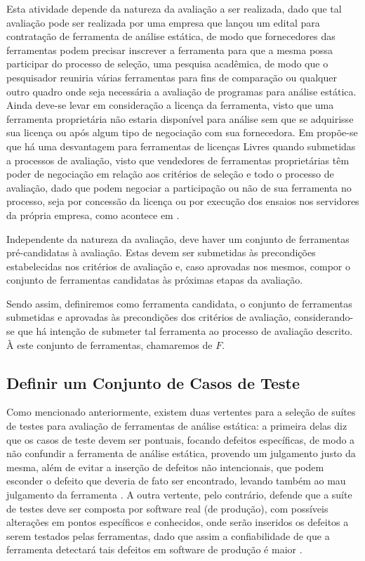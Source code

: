 Esta atividade depende da natureza da avaliação a ser realizada, dado que tal avaliação pode ser realizada por uma empresa que lançou um edital para contratação de ferramenta de análise estática, de modo que fornecedores das ferramentas podem precisar inscrever a ferramenta para que a mesma possa participar do processo de seleção, uma pesquisa acadêmica, de modo que o pesquisador reuniria várias ferramentas para fins de comparação ou qualquer outro quadro onde seja necessária a avaliação de programas para análise estática. Ainda deve-se levar em consideração a licença da ferramenta, visto que uma ferramenta proprietária não estaria disponível para análise sem que se adquirisse sua licença ou após algum tipo de negociação com sua fornecedora. Em \cite{pascal} propõe-se que há uma desvantagem para ferramentas de licenças Livres quando submetidas a processos de avaliação, visto que vendedores de ferramentas proprietárias têm poder de negociação em relação aos critérios de seleção e todo o processo de avaliação, dado que podem negociar a participação ou não de sua ferramenta no processo, seja por concessão da licença ou por execução dos ensaios nos servidores da própria empresa, como acontece em \cite{sate_iv}.

Independente da natureza da avaliação, deve haver um conjunto de ferramentas pré-candidatas à avaliação. Estas devem ser submetidas às precondições estabelecidas nos critérios de avaliação e, caso aprovadas nos mesmos, compor o conjunto de ferramentas candidatas às próximas etapas da avaliação.

Sendo assim, definiremos como ferramenta candidata, o conjunto de ferramentas submetidas e aprovadas às precondições dos critérios de avaliação, considerando-se que há intenção de submeter tal ferramenta ao processo de avaliação descrito. À este conjunto de ferramentas, chamaremos de $F$.

\subsection{Definir um Conjunto de Casos de Teste}

Como mencionado anteriormente, existem duas vertentes para a seleção de suítes de testes para avaliação de ferramentas de análise estática: a primeira delas diz que os casos de teste devem ser pontuais, focando defeitos específicas, de modo a não confundir a ferramenta de análise estática, provendo um julgamento justo da mesma, além de  evitar a inserção de defeitos não intencionais, que podem esconder o defeito que deveria de fato ser encontrado, levando também ao mau julgamento da ferramenta \cite{pascal}. A outra vertente, pelo contrário, defende que a suíte de testes deve ser composta por software real (de produção), com possíveis alterações em pontos específicos e conhecidos,  onde serão inseridos os defeitos a serem testados  pelas ferramentas, dado que assim a confiabilidade de que a ferramenta detectará tais defeitos em software de produção  é maior \cite{harvard}.

